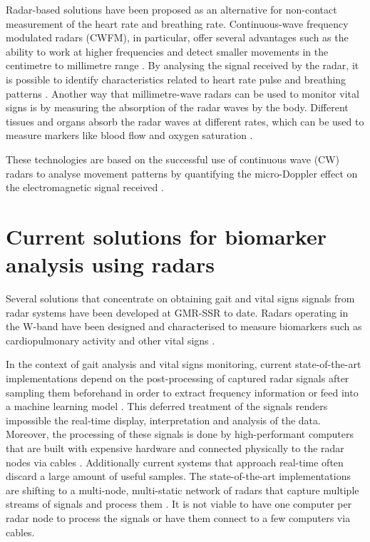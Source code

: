 	Radar-based solutions have been proposed as an alternative for non-contact measurement of the heart rate and breathing rate. Continuous-wave frequency modulated radars (CWFM), in particular, offer several advantages such as the ability to work at higher frequencies and detect smaller movements in the centimetre to millimetre range \cite{Lv2018}. By analysing the signal received by the radar, it is possible to identify characteristics related to heart rate pulse and breathing patterns \cite{Antolinos2020}. Another way that millimetre-wave radars can be used to monitor vital signs is by measuring the absorption of the radar waves by the body. Different tissues and organs absorb the radar waves at different rates, which can be used to measure markers like blood flow and oxygen saturation \cite{Weenk2017,Amin2017, Antolinos2020}.
	
	These technologies are based on the successful use of continuous wave (CW) radars to analyse movement patterns by quantifying the micro-Doppler effect on the electromagnetic signal received \cite{Antolinos2020, Seifert2019}.
	
	\section{Current solutions for biomarker analysis using radars}

	Several solutions that concentrate on obtaining gait and vital signs signals from radar systems have been developed at GMR-SSR to date. Radars operating in the W-band have been designed and characterised to measure biomarkers such as cardiopulmonary activity \cite{Antolinos2020} and other vital signs \cite{Sardinero2022}.

	In the context of gait analysis and vital signs monitoring, current state-of-the-art implementations \cite{Liu2022,Antolinos2020,Biase2020,Zanardi2021,Seifert2019,Iyer2022,Amin2017} depend on the post-processing of captured radar signals after sampling them beforehand in order to extract frequency information \cite{Antolinos2020, Seifert2019} or feed into a machine learning model \cite{Iyer2022}. This deferred treatment of the signals renders impossible the real-time display, interpretation and analysis of the data. Moreover, the processing of these signals is done by high-performant computers that are built with expensive hardware and connected physically to the radar nodes via cables \cite[p.~7]{Antolinos2020} \cite[p.~26]{Sardinero2022}. Additionally current systems that approach real-time often discard a large amount of useful samples. The state-of-the-art implementations are shifting to a multi-node, multi-static network of radars that capture multiple streams of signals and process them \cite{Liu2022,Smith2008,Karabacak2013,Tekeli2013,Tahmoush2009}. It is not viable to have one computer per radar node to process the signals or have them connect to a few computers via cables.
	
